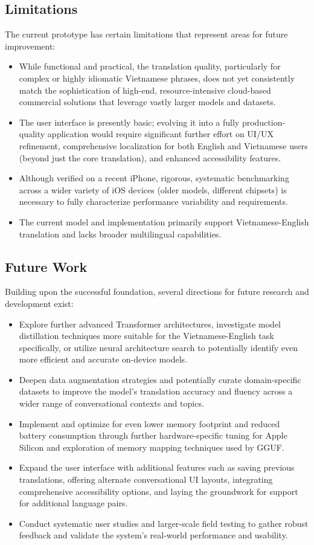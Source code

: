 \documentclass[12pt]{article}
\begin{document}
\subsection*{Limitations}
The current prototype has certain limitations that represent areas for future improvement:
\begin{itemize}
    \item While functional and practical, the translation quality, particularly for complex or highly idiomatic Vietnamese phrases, does not yet consistently match the sophistication of high-end, resource-intensive cloud-based commercial solutions that leverage vastly larger models and datasets.
    \item The user interface is presently basic; evolving it into a fully production-quality application would require significant further effort on UI/UX refinement, comprehensive localization for both English and Vietnamese users (beyond just the core translation), and enhanced accessibility features.
    \item Although verified on a recent iPhone, rigorous, systematic benchmarking across a wider variety of iOS devices (older models, different chipsets) is necessary to fully characterize performance variability and requirements.
    \item The current model and implementation primarily support Vietnamese-English translation and lacks broader multilingual capabilities.
\end{itemize}

\subsection*{Future Work}
Building upon the successful foundation, several directions for future research and development exist:
\begin{itemize}
    \item Explore further advanced Transformer architectures, investigate model distillation techniques more suitable for the Vietnamese-English task specifically, or utilize neural architecture search to potentially identify even more efficient and accurate on-device models.
    \item Deepen data augmentation strategies and potentially curate domain-specific datasets to improve the model's translation accuracy and fluency across a wider range of conversational contexts and topics.
    \item Implement and optimize for even lower memory footprint and reduced battery consumption through further hardware-specific tuning for Apple Silicon and exploration of memory mapping techniques used by GGUF.
    \item Expand the user interface with additional features such as saving previous translations, offering alternate conversational UI layouts, integrating comprehensive accessibility options, and laying the groundwork for support for additional language pairs.
    \item Conduct systematic user studies and larger-scale field testing to gather robust feedback and validate the system's real-world performance and usability.
\end{itemize}
\end{document}
